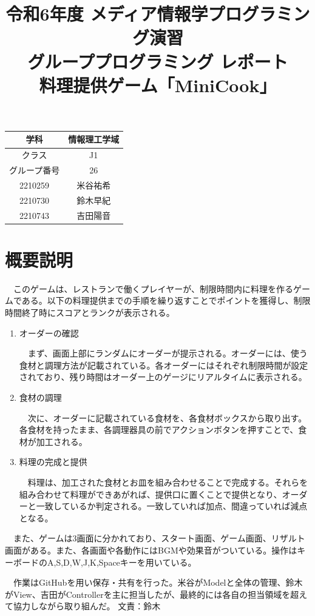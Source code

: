 \documentclass[a4j]{jarticle} %
\title{令和6年度 メディア情報学プログラミング演習\\グループプログラミング レポート\\料理提供ゲーム「MiniCook」}
\begin{document}
\maketitle

\begin{center}%
  \begin{tabular}{|c||c|}
      \hline
      学科&情報理工学域\\
      \hline
      クラス&J1\\
      \hline
      グループ番号&26\\
      \hline
      2210259&米谷祐希\\
      \hline
      2210730&鈴木早紀\\
      \hline
      2210743&吉田陽音\\
      \hline
  \end{tabular}
\end{center}

\newpage

\section{概要説明}
　このゲームは、レストランで働くプレイヤーが、制限時間内に料理を作るゲームである。以下の料理提供までの手順を繰り返すことでポイントを獲得し、制限時間終了時にスコアとランクが表示される。
\begin{enumerate}
  \item オーダーの確認\par
  　まず、画面上部にランダムにオーダーが提示される。オーダーには、使う食材と調理方法が記載されている。各オーダーにはそれぞれ制限時間が設定されており、残り時間はオーダー上のゲージにリアルタイムに表示される。
  \item 食材の調理\par
  　次に、オーダーに記載されている食材を、各食材ボックスから取り出す。各食材を持ったまま、各調理器具の前でアクションボタンを押すことで、食材が加工される。
  \item 料理の完成と提供\par
  　料理は、加工された食材とお皿を組み合わせることで完成する。それらを組み合わせて料理ができあがれば、提供口に置くことで提供となり、オーダーと一致しているか判定される。一致していれば加点、間違っていれば減点となる。   
\end{enumerate}
　また、ゲームは3画面に分かれており、スタート画面、ゲーム画面、リザルト画面がある。また、各画面や各動作にはBGMや効果音がついている。操作はキーボードのA,S,D,W,J,K,Spaceキーを用いている。\par
　作業はGitHubを用い保存・共有を行った。米谷がModelと全体の管理、鈴木がView、吉田がControllerを主に担当したが、最終的には各自の担当領域を超えて協力しながら取り組んだ。
文責：鈴木
\end{document}
